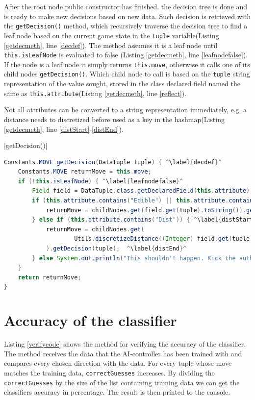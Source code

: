 \documentclass{article}
\begin{document}
    After the root node public constructor has finished. the decision tree is done and is ready to make new decisions based on new data. Such decision is retrieved with the \verb|getDecision()| method, which recursively traverse the decision tree to find a leaf node based on the current game state in the \verb|tuple| variable(Listing \ref{getdecmeth}, line \ref{decdef}). The method assumes it is a leaf node until \verb|this.isLeafNode| is evaluated to false (Listing \ref{getdecmeth}, line \ref{leafnodefalse}). If the node is a leaf node it simply returns \verb|this.move|, otherwise it calls one of its child nodes \verb|getDecision()|. Which child node to call is based on the \verb|tuple| string representation of the value sought, stored in the class declared field named the same as \verb|this.attribute|(Listing \ref{getdecmeth}, line \ref{reflect}).

    Not all attributes can be converted to a string representation immediately, e.g. a distance needs to discretized before used as a key in the hashmap(Listing \ref{getdecmeth}, line \ref{distStart}-\ref{distEnd}).

    |getDecision()|
    \begin{lstlisting}[language=Java, caption=The \protect\UseVerb{getdec} method., label={getdecmeth}, escapechar=^]
Constants.MOVE getDecision(DataTuple tuple) { ^\label{decdef}^
    Constants.MOVE returnMove = this.move;
    if (!this.isLeafNode) { ^\label{leafnodefalse}^
        Field field = DataTuple.class.getDeclaredField(this.attribute);^\label{reflect}^
        if (this.attribute.contains("Edible") || this.attribute.contains("Dir")) {
            returnMove = childNodes.get(field.get(tuple).toString()).getDecision(tuple);
        } else if (this.attribute.contains("Dist")) { ^\label{distStart}^
            returnMove = childNodes.get(
                    Utils.discretizeDistance((Integer) field.get(tuple)).toString()
            ).getDecision(tuple);  ^\label{distEnd}^
        } else System.out.println("This shouldn't happen. Kick the author in the butt");
    }
    return returnMove;
}\end{lstlisting}

\section{Accuracy of the classifier}
Listing \ref{verifycode} shows the method for verifying the accuracy of the classifier. The method receives the data that the AI-controller has been trained with and compares every chosen direction with the data. For every tuple whose move matches the training data, \verb|correctGuesses| increases. By dividing the \verb|correctGuesses| by the size of the list containing training data we can get the classifiers accuracy in percentage. The result is then printed to the console.
\end{document}
